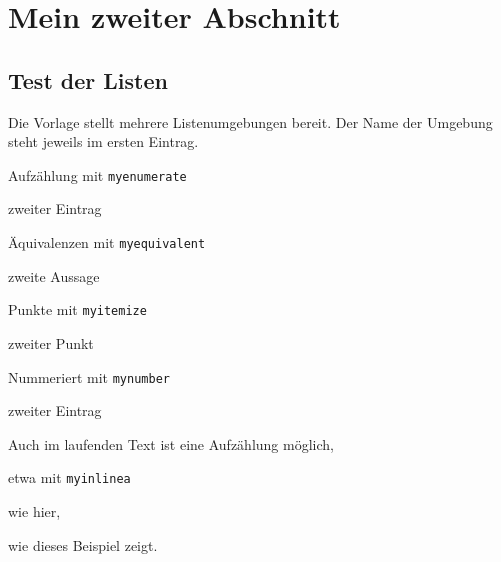
\thispagestyle{empty}
\section{Mein zweiter Abschnitt}\label{sec:zweiter-abschnitt}
\subsection{Test der Listen}\label{subsec:listen}
Die Vorlage stellt mehrere Listenumgebungen bereit.
Der Name der Umgebung steht jeweils im ersten Eintrag.
\begin{myenumerate}
\item
Aufzählung mit \verb|myenumerate|
\item
zweiter Eintrag
\end{myenumerate}
\begin{myequivalent}
\item
Äquivalenzen mit \verb|myequivalent|
\item
zweite Aussage
\end{myequivalent}
\begin{myitemize}
\item
Punkte mit \verb|myitemize|
\item
zweiter Punkt
\end{myitemize}
\begin{mynumber}
\item
Nummeriert mit \verb|mynumber|
\item
zweiter Eintrag
\end{mynumber}
Auch im laufenden Text ist eine Aufzählung möglich,
\begin{myinlinea}
\item
etwa mit \verb|myinlinea|
\item
wie hier,
\end{myinlinea}
wie dieses Beispiel zeigt.
